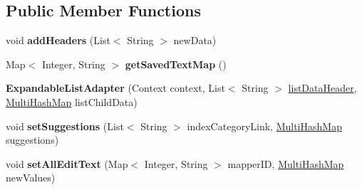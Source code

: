 \subsection*{Public Member Functions}
\begin{DoxyCompactItemize}
\item 
void {\bfseries add\+Headers} (List$<$ String $>$ new\+Data)\hypertarget{classcom_1_1example_1_1sebastian_1_1tindertp_1_1ExpandableListAdapter_a041c19f1ae7f6ae4c014f298634af8e1}{}\label{classcom_1_1example_1_1sebastian_1_1tindertp_1_1ExpandableListAdapter_a041c19f1ae7f6ae4c014f298634af8e1}

\item 
Map$<$ Integer, String $>$ {\bfseries get\+Saved\+Text\+Map} ()\hypertarget{classcom_1_1example_1_1sebastian_1_1tindertp_1_1ExpandableListAdapter_ab9f6ec87cc2a39c012999a4eba781e93}{}\label{classcom_1_1example_1_1sebastian_1_1tindertp_1_1ExpandableListAdapter_ab9f6ec87cc2a39c012999a4eba781e93}

\item 
{\bfseries Expandable\+List\+Adapter} (Context context, List$<$ String $>$ \hyperlink{classcom_1_1example_1_1sebastian_1_1tindertp_1_1ExpandableListAdapter_a16ce01b647cbc647cde3970e4f49986a}{list\+Data\+Header}, \hyperlink{classcom_1_1example_1_1sebastian_1_1tindertp_1_1commonTools_1_1MultiHashMap}{Multi\+Hash\+Map} list\+Child\+Data)\hypertarget{classcom_1_1example_1_1sebastian_1_1tindertp_1_1ExpandableListAdapter_afadaba5f393199c25f2e6eb7d37f91fd}{}\label{classcom_1_1example_1_1sebastian_1_1tindertp_1_1ExpandableListAdapter_afadaba5f393199c25f2e6eb7d37f91fd}

\item 
void {\bfseries set\+Suggestions} (List$<$ String $>$ index\+Category\+Link, \hyperlink{classcom_1_1example_1_1sebastian_1_1tindertp_1_1commonTools_1_1MultiHashMap}{Multi\+Hash\+Map} suggestions)\hypertarget{classcom_1_1example_1_1sebastian_1_1tindertp_1_1ExpandableListAdapter_a0a218f396a5e4a42daf6d769cf20b992}{}\label{classcom_1_1example_1_1sebastian_1_1tindertp_1_1ExpandableListAdapter_a0a218f396a5e4a42daf6d769cf20b992}

\item 
void {\bfseries set\+All\+Edit\+Text} (Map$<$ Integer, String $>$ mapper\+ID, \hyperlink{classcom_1_1example_1_1sebastian_1_1tindertp_1_1commonTools_1_1MultiHashMap}{Multi\+Hash\+Map} new\+Values)\hypertarget{classcom_1_1example_1_1sebastian_1_1tindertp_1_1ExpandableListAdapter_ae304223370643e9a39a6c05f5acf9198}{}\label{classcom_1_1example_1_1sebastian_1_1tindertp_1_1ExpandableListAdapter_ae304223370643e9a39a6c05f5acf9198}


\end{DoxyCompactItemize}

